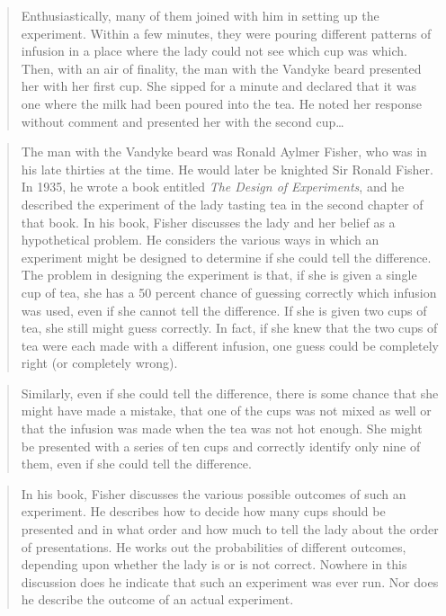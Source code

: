 \documentclass[]{tufte-book}
\theoremstyle{definition}
\theoremstyle{definition}
\theoremstyle{remark}
\begin{document}
\begin{quote}
Enthusiastically, many of them joined with him in setting up the
experiment. Within a few minutes, they were pouring different patterns
of infusion in a place where the lady could not see which cup was which.
Then, with an air of finality, the man with the Vandyke beard presented
her with her first cup. She sipped for a minute and declared that it was
one where the milk had been poured into the tea. He noted her response
without comment and presented her with the second cup\ldots{}
\end{quote}

\begin{quote}
The man with the Vandyke beard was Ronald Aylmer Fisher, who was in his
late thirties at the time. He would later be knighted Sir Ronald Fisher.
In 1935, he wrote a book entitled \emph{The Design of Experiments}, and
he described the experiment of the lady tasting tea in the second
chapter of that book. In his book, Fisher discusses the lady and her
belief as a hypothetical problem. He considers the various ways in which
an experiment might be designed to determine if she could tell the
difference. The problem in designing the experiment is that, if she is
given a single cup of tea, she has a 50 percent chance of guessing
correctly which infusion was used, even if she cannot tell the
difference. If she is given two cups of tea, she still might guess
correctly. In fact, if she knew that the two cups of tea were each made
with a different infusion, one guess could be completely right (or
completely wrong).
\end{quote}

\begin{quote}
Similarly, even if she could tell the difference, there is some chance
that she might have made a mistake, that one of the cups was not mixed
as well or that the infusion was made when the tea was not hot enough.
She might be presented with a series of ten cups and correctly identify
only nine of them, even if she could tell the difference.
\end{quote}

\begin{quote}
In his book, Fisher discusses the various possible outcomes of such an
experiment. He describes how to decide how many cups should be presented
and in what order and how much to tell the lady about the order of
presentations. He works out the probabilities of different outcomes,
depending upon whether the lady is or is not correct. Nowhere in this
discussion does he indicate that such an experiment was ever run. Nor
does he describe the outcome of an actual experiment.
\end{quote}
\end{document}
